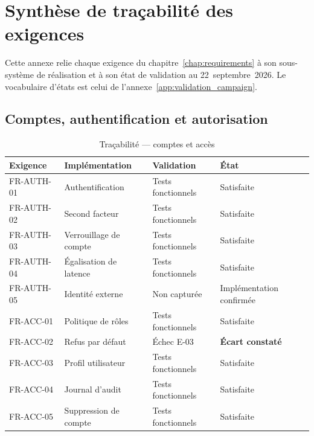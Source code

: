 \chapter{Synthèse de traçabilité des exigences}
\label{app:traceability}

Cette annexe relie chaque exigence du chapitre~\ref{chap:requirements} à son
sous-système de réalisation et à son état de validation au
22~septembre~2026. Le vocabulaire d'états est celui de
l'annexe~\ref{app:validation_campaign}.

\section{Comptes, authentification et autorisation}

\begin{table}[htbp]
  \centering
  \caption{Traçabilité — comptes et accès}
  \begin{tabularx}{\textwidth}{L{2.3cm} L{3.4cm} L{3.0cm} X}
    \toprule
    \textbf{Exigence} & \textbf{Implémentation} & \textbf{Validation} & \textbf{État} \\
    \midrule
    FR-AUTH-01 & Authentification & Tests fonctionnels & Satisfaite \\
    FR-AUTH-02 & Second facteur & Tests fonctionnels & Satisfaite \\
    FR-AUTH-03 & Verrouillage de compte & Tests fonctionnels & Satisfaite \\
    FR-AUTH-04 & Égalisation de latence & Tests fonctionnels & Satisfaite \\
    FR-AUTH-05 & Identité externe & Non capturée & Implémentation confirmée \\
    FR-ACC-01 & Politique de rôles & Tests fonctionnels & Satisfaite \\
    FR-ACC-02 & Refus par défaut & Échec E-03 & \textbf{Écart constaté} \\
    FR-ACC-03 & Profil utilisateur & Tests fonctionnels & Satisfaite \\
    FR-ACC-04 & Journal d'audit & Tests fonctionnels & Satisfaite \\
    FR-ACC-05 & Suppression de compte & Tests fonctionnels & Satisfaite \\
    \bottomrule
  \end{tabularx}
\end{table}

